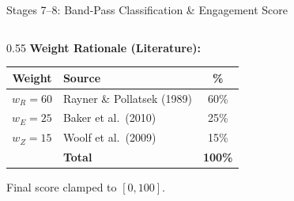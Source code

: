 \documentclass[aspectratio=169,10pt]{beamer}
\begin{document}
\begin{frame}{Stages 7--8: Band-Pass Classification \& Engagement Score}
\begin{columns}[T]
\begin{column}{0.55\textwidth}
\vspace{4pt}
\textbf{Weight Rationale (Literature):}
\begin{tabular}{@{}clc@{}}
\toprule
\textbf{Weight} & \textbf{Source} & \textbf{\%} \\
\midrule
$w_R = 60$ & Rayner \& Pollatsek (1989) & 60\% \\
$w_E = 25$ & Baker et al.\ (2010) & 25\% \\
$w_Z = 15$ & Woolf et al.\ (2009) & 15\% \\
\midrule
& \textbf{Total} & \textbf{100\%} \\
\bottomrule
\end{tabular}

\vspace{2pt}
\scriptsize Final score clamped to $[0, 100]$.
\end{column}
\end{columns}
\end{frame}
\end{document}
